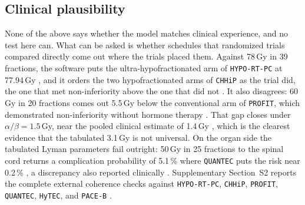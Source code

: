 \documentclass[preprint,12pt,number]{elsarticle}
\begin{document}
\subsection{Clinical plausibility} None of the above says whether the model matches clinical experience, and no test here can. What can be asked is whether
schedules that randomized trials compared directly come out where the trials placed them. Against 78\,Gy in 39 fractions, the software puts the ultra-hypofractionated arm of \texttt{HYPO-RT-PC} at 77.94\,Gy \cite{widmark2019hypo}, and it orders the two hypofractionated arms of \texttt{CHHiP} as the trial did, the one that met non-inferiority above the one that did not \cite{dearnaley2016chhip}. It also disagrees: 60\,Gy in 20 fractions comes out 5.5\,Gy below the
conventional arm of \texttt{PROFIT}, which demonstrated non-inferiority without hormone therapy \cite{catton2017profit}. That gap closes under $\alpha/\beta = 1.5$\,Gy, near the pooled clinical estimate of 1.4\,Gy \cite{miralbell2012alphabeta}, which is the clearest evidence that the tabulated 3.1\,Gy is not universal. On the organ side the tabulated Lyman parameters fail outright: 50\,Gy in 25 fractions to the spinal cord returns a complication probability of 5.1\,\% where \texttt{QUANTEC} puts the risk near 0.2\,\% \cite{kirkpatrick2010quantec}, a discrepancy also reported clinically \cite{daly2012lkb}.  Supplementary Section~S2 reports the complete external coherence checks against \texttt{HYPO-RT-PC}, \texttt{CHHiP}, \texttt{PROFIT}, \texttt{QUANTEC}, \texttt{HyTEC}, and \texttt{PACE-B} \cite{sahgal2021hytec}.
\end{document}
